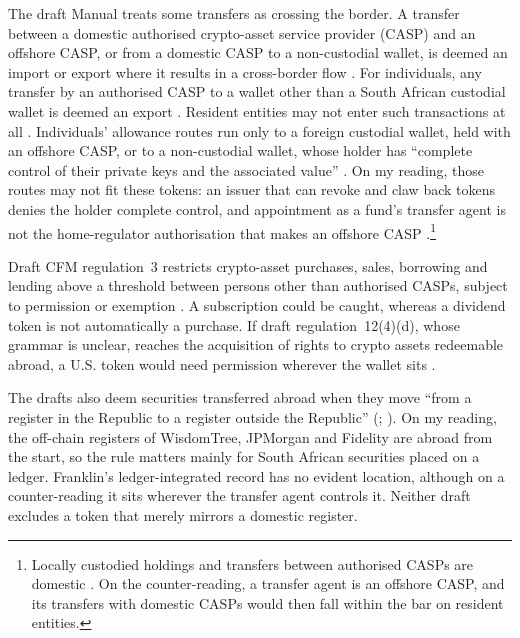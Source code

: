 \documentclass[12pt,a4paper]{article}
\begin{document}
The draft Manual treats some transfers as crossing the border. A transfer between a domestic authorised crypto-asset service provider (CASP) and an offshore CASP, or from a domestic CASP to a non-custodial wallet, is deemed an import or export where it results in a cross-border flow \citep[B.1(A)(ii), p.~24]{SARB2026CryptoManual}. For individuals, any transfer by an authorised CASP to a wallet other than a South African custodial wallet is deemed an export \citep[B.1(C)(iii)(a)(dd), p.~28]{SARB2026CryptoManual}. Resident entities may not enter such transactions at all \citep[B.1(C)(iii)(b)(dd), p.~31]{SARB2026CryptoManual}. Individuals' allowance routes run only to a foreign custodial wallet, held with an offshore CASP, or to a non-custodial wallet, whose holder has ``complete control of their private keys and the associated value'' \citep[A.1, p.~8; B.1(C)(iii)(a)(hh), (ii), pp.~28--30]{SARB2026CryptoManual}. On my reading, those routes may not fit these tokens: an issuer that can revoke and claw back tokens denies the holder complete control, and appointment as a fund's transfer agent is not the home-regulator authorisation that makes an offshore CASP \citep[A.1, p.~9]{SARB2026CryptoManual}.\footnote{Locally custodied holdings and transfers between authorised CASPs are domestic \citep[B.1(C)(iii)(b)(aa)--(cc), p.~31]{SARB2026CryptoManual}. On the counter-reading, a transfer agent is an offshore CASP, and its transfers with domestic CASPs would then fall within the bar on resident entities.}

Draft CFM regulation~3 restricts crypto-asset purchases, sales, borrowing and lending above a threshold between persons other than authorised CASPs, subject to permission or exemption \citep[regs~3(1)--(4), 23(6), pp.~6--7, 24]{NT2026CFMDraft}. A subscription could be caught, whereas a dividend token is not automatically a purchase. If draft regulation~12(4)(d), whose grammar is unclear, reaches the acquisition of rights to crypto assets redeemable abroad, a U.S. token would need permission wherever the wallet sits \citep[pp.~15--16]{NT2026CFMDraft}.

The drafts also deem securities transferred abroad when they move ``from a register in the Republic to a register outside the Republic'' (\citealp[reg~1(1), p.~5]{NT2026CFMDraft}; \citealp[A.1, p.~10, in equivalent terms]{SARB2026CryptoManual}). On my reading, the off-chain registers of WisdomTree, JPMorgan and Fidelity are abroad from the start, so the rule matters mainly for South African securities placed on a ledger. Franklin's ledger-integrated record has no evident location, although on a counter-reading it sits wherever the transfer agent controls it. Neither draft excludes a token that merely mirrors a domestic register.
\end{document}
